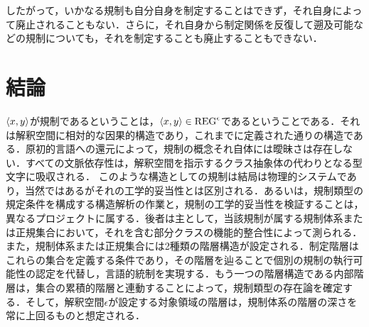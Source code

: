 \noindent したがって，いかなる規制も自分自身を制定することはできず，それ自身によって廃止されることもない．さらに，それ自身から制定関係を反復して遡及可能などの規制についても，それを制定することも廃止することもできない．

\section{結論}
\label{sec:結論}

$ \langle x,y \rangle $が規制であるということは，$ \langle x,y \rangle\in\mathrm{REG}^\epsilon $であるということである．それは解釈空間に相対的な因果的構造であり，これまでに定義された通りの構造である．原初的言語への還元によって，規制の概念それ自体には曖昧さは存在しない．すべての文脈依存性は，解釈空間を指示するクラス抽象体の代わりとなる型文字\kagi{$ \epsilon $}に吸収される．
このような構造としての規制は結局は物理的システムであり，当然ではあるがそれの工学的妥当性とは区別される．あるいは，規制類型の規定条件を構成する構造解析の作業と，規制の工学的妥当性を検証することは，異なるプロジェクトに属する．後者は主として，当該規制が属する規制体系または正規集合において，それを含む部分クラスの機能的整合性によって測られる．
また，規制体系または正規集合には2種類の階層構造が設定される．制定階層はこれらの集合を定義する条件であり，その階層を辿ることで個別の規制の執行可能性の認定を代替し，言語的統制を実現する．もう一つの階層構造である内部階層は，集合の累積的階層と連動することによって，規制類型の存在論を確定する．そして，解釈空間$\epsilon$が設定する対象領域の階層は，規制体系の階層の深さを常に上回るものと想定される．
